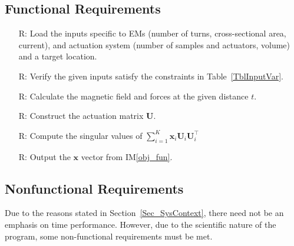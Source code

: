 \documentclass[12pt]{article}
\newcounter{reqnum} %
\begin{document}
\subsection{Functional Requirements}

\noindent \begin{itemize}

\item[R\refstepcounter{reqnum}\thereqnum \label{R_Inputs}:] Load the inputs specific to EMs (number of turns, cross-sectional area, current), and actuation system (number of samples and actuators, volume) and a target location. 
\item[R\refstepcounter{reqnum}\thereqnum \label{R_InputsSat}:] Verify the given inputs satisfy the constraints in Table~\ref{TblInputVar}.
\item[R\refstepcounter{reqnum}\thereqnum \label{R_CalculateMag}:] Calculate the magnetic field and forces at the given distance  $t$.
\item[R\refstepcounter{reqnum}\thereqnum \label{R_CalculateAct}:] Construct the actuation matrix $\mathcal{\bm U}$. 
\item[R\refstepcounter{reqnum}\thereqnum \label{R_CalculateSing}:] Compute the singular values of $\sum_{i=1}^{K}\bm x_i \mathcal{\bm U}_i \mathcal{\bm U}_i^\top$
\item[R\refstepcounter{reqnum}\thereqnum \label{R_CalculateX}:] Output the $\bm x$ vector from IM\ref{obj_fun}.
\end{itemize}

\subsection{Nonfunctional Requirements}
Due to the reasons stated in Section~\ref{Sec_SysContext}, there need not be an emphasis on time performance. However, due to the scientific nature of the program, some non-functional requirements must be met.  
\end{document}
